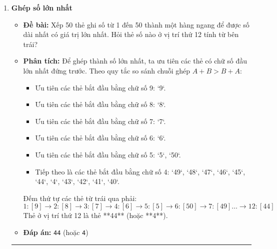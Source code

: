 \documentclass[11pt,a4paper]{article}
\begin{document}
\begin{enumerate}[label=\textbf{Câu \arabic*:}, leftmargin=*]
\item \textbf{Ghép số lớn nhất}
    \begin{itemize}
        \item \textbf{Đề bài:} Xếp 50 thẻ ghi số từ 1 đến 50 thành một hàng ngang để được số dài nhất có giá trị lớn nhất. Hỏi thẻ số nào ở vị trí thứ 12 tính từ bên trái?
        \item \textbf{Phân tích:}
            Để ghép thành số lớn nhất, ta ưu tiên các thẻ có chữ số đầu lớn nhất đứng trước. Theo quy tắc so sánh chuỗi ghép $A+B > B+A$:
            \begin{itemize}
                \item Ưu tiên các thẻ bắt đầu bằng chữ số 9: `9`.
                \item Ưu tiên các thẻ bắt đầu bằng chữ số 8: `8`.
                \item Ưu tiên các thẻ bắt đầu bằng chữ số 7: `7`.
                \item Ưu tiên các thẻ bắt đầu bằng chữ số 6: `6`.
                \item Ưu tiên các thẻ bắt đầu bằng chữ số 5: `5`, `50`.
                \item Tiếp theo là các thẻ bắt đầu bằng chữ số 4: `49`, `48`, `47`, `46`, `45`, `44`, `4`, `43`, `42`, `41`, `40`.
            \end{itemize}
            Đếm thứ tự các thẻ từ trái qua phải:
            $$1: [9] \to 2: [8] \to 3: [7] \to 4: [6] \to 5: [5] \to 6: [50] \to 7: [49] \dots \to 12: [44]$$
            Thẻ ở vị trí thứ 12 là thẻ **44** (hoặc **4**).
        \item \textbf{Đáp án:} \texttt{44} (hoặc \texttt{4})
    \end{itemize}

\hrule
\vspace{0.5cm}


\end{enumerate}
\end{document}
